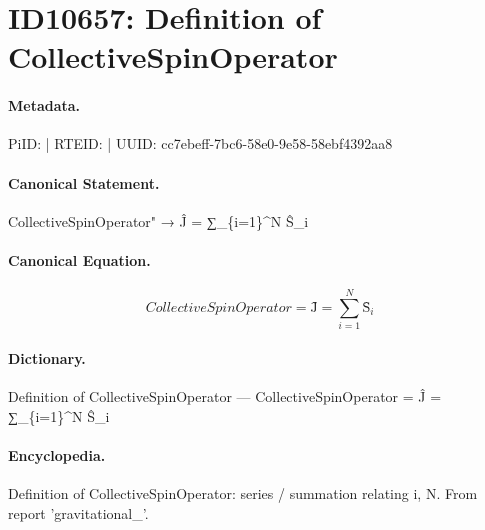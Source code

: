 \section*{ID10657: Definition of CollectiveSpinOperator}
\paragraph{Metadata.}
PiID:  | RTEID:  | UUID: cc7ebeff-7bc6-58e0-9e58-58ebf4392aa8

\paragraph{Canonical Statement.}
CollectiveSpinOperator" → Ĵ = ∑\_\{i=1\}\textasciicircum{}N Ŝ\_i

\paragraph{Canonical Equation.}
\[
CollectiveSpinOperator = Ĵ = ∑_{i=1}^N Ŝ_i
\]

\paragraph{Dictionary.}
Definition of CollectiveSpinOperator — CollectiveSpinOperator = Ĵ = ∑\_\{i=1\}\textasciicircum{}N Ŝ\_i

\paragraph{Encyclopedia.}
Definition of CollectiveSpinOperator: series / summation relating i, N. From report 'gravitational\_'.
